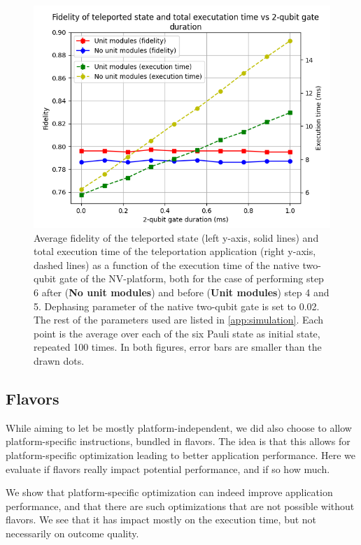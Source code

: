 \begin{figure}
    \centering
    \includegraphics[scale=0.8]{figures/netqasm/plots/paper_teleport_sweep_gate_time.png}
    \caption{
        Average fidelity of the teleported state (left y-axis, solid lines) and total
        execution time of the teleportation application (right y-axis, dashed
        lines) as a function of the execution time of the native two-qubit gate
        of the NV-platform, both for the case of performing step 6 after
        (\textbf{No unit modules}) and before (\textbf{Unit modules}) step 4 and
        5. Dephasing parameter of the native two-qubit gate is set to 0.02. The
        rest of the parameters used are listed in \cref{app:simulation}. Each
        point is the average over each of the six Pauli state as initial state,
        repeated 100 times. In both figures, error bars are smaller than the drawn
        dots.}
  \label{fig:sweep_gate_time}
\end{figure}



\subsection{Flavors}\label{sec:evaluation-flavours}
While aiming to let \netqasm be mostly platform-independent, we did also choose to allow platform-specific instructions, bundled in flavors.
The idea is that this allows for platform-specific optimization leading to better application performance.
Here we evaluate if flavors really impact potential performance, and if so how much.

We show that platform-specific optimization can indeed improve application performance, and that there are such optimizations that are not possible without flavors.
We see that it has impact mostly on the execution time, but not necessarily on outcome quality.

